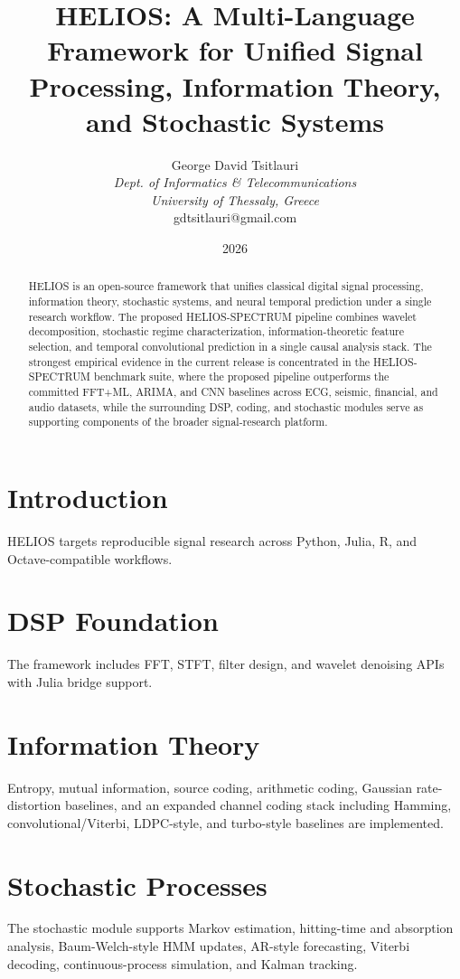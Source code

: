 \documentclass[10pt,conference]{IEEEtran}
\title{HELIOS: A Multi-Language Framework for Unified Signal Processing, Information Theory, and Stochastic Systems}
\author{George David Tsitlauri\\
\textit{Dept. of Informatics \& Telecommunications}\\
\textit{University of Thessaly, Greece}\\
gdtsitlauri@gmail.com}
\date{2026}
\begin{document}
\maketitle

\begin{abstract}
HELIOS is an open-source framework that unifies classical digital signal processing, information theory, stochastic systems, and neural temporal prediction under a single research workflow. The proposed HELIOS-SPECTRUM pipeline combines wavelet decomposition, stochastic regime characterization, information-theoretic feature selection, and temporal convolutional prediction in a single causal analysis stack. The strongest empirical evidence in the current release is concentrated in the
HELIOS-SPECTRUM benchmark suite, where the proposed pipeline outperforms the
committed FFT+ML, ARIMA, and CNN baselines across ECG, seismic, financial, and
audio datasets, while the surrounding DSP, coding, and stochastic modules serve
as supporting components of the broader signal-research platform.
\end{abstract}

\section{Introduction}
HELIOS targets reproducible signal research across Python, Julia, R, and Octave-compatible workflows.

\section{DSP Foundation}
The framework includes FFT, STFT, filter design, and wavelet denoising APIs with Julia bridge support.

\section{Information Theory}
Entropy, mutual information, source coding, arithmetic coding, Gaussian rate-distortion baselines, and an expanded channel coding stack including Hamming, convolutional/Viterbi, LDPC-style, and turbo-style baselines are implemented.

\section{Stochastic Processes}
The stochastic module supports Markov estimation, hitting-time and absorption analysis, Baum-Welch-style HMM updates, AR-style forecasting, Viterbi decoding, continuous-process simulation, and Kalman tracking.
\end{document}
